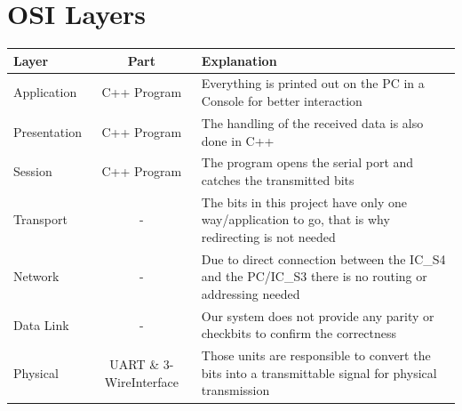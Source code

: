 \documentclass[12pt,a4 paper] {report}
\begin{document}
\newpage

\section*{OSI Layers}
\begin{center}
	\begin{tabular}{ | p{2cm} | c | p{5cm} |}
		\hline
		\textbf{Layer} & \textbf{Part} & \textbf{Explanation} \\
		\hline
		Application & C++ Program & Everything is printed out on the PC in a Console for better interaction \\
		\hline
		Presentation & C++ Program & The handling of the received data is also done in C++ \\
		\hline
		Session & C++ Program & The program opens the serial port and catches the transmitted bits \\
		\hline
		Transport & - & The bits in this project have only one way/application to go, that is why redirecting is not needed \\
		\hline
		Network & - & Due to direct connection between the IC\_S4 and the PC/IC\_S3 there is no routing or addressing needed \\
		\hline
		Data Link & - & Our system does not provide any parity or checkbits to confirm the correctness \\
		\hline
		Physical & UART \& 3-WireInterface & Those units are responsible to convert the bits into a transmittable signal for physical transmission \\
		\hline
	\end{tabular}
\end{center}

\newpage
\end{document}
